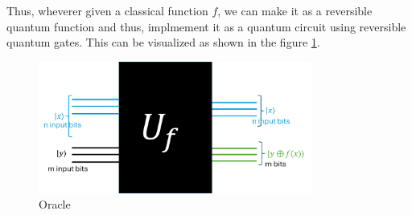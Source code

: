 \documentclass[12pt, oneside]{book}
\theoremstyle{definition}
\theoremstyle{definition}
\theoremstyle{remark}
\begin{document}
Thus, wheverer given a classical function $f$, we can make it as a reversible quantum function and thus, implmement
it as a quantum circuit using reversible quantum gates. This can be visualized as shown in the figure \ref{oracle}.
\begin{figure}[H]
    \centering
    \includegraphics[width=0.8\textwidth]{../images/oracle.png}
    \caption{Oracle}
    \label{oracle}
\end{figure}
\end{document}
